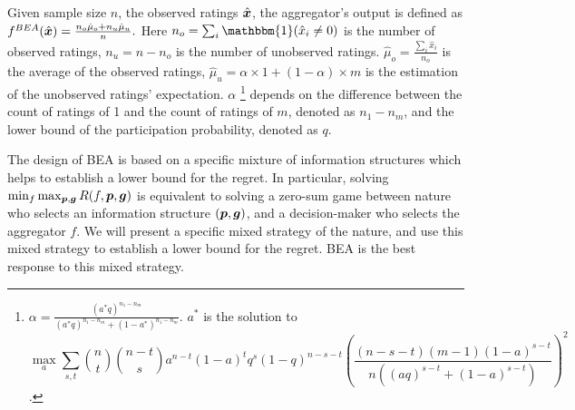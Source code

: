 \begin{definition}
Given sample size $n$, the observed ratings $\hat{{\bm{x}}}$, the aggregator's output is defined as
\(f^{BEA}(\hat{{\bm{x}}})=\frac{n_o\hat{\mu}_o+n_u \hat{\mu}_u}{n}.\) Here $n_o=\sum_i \mathbbm{1}(\hat{x}_i\neq 0)$ is the number of observed ratings, $n_u=n-n_o$ is the number of unobserved ratings. $\hat{\mu}_o=\frac{\sum_i \hat{x}_i}{n_o}$ is the average of the observed ratings, $\hat{\mu}_u=\alpha\times 1+(1-\alpha)\times m$ is the estimation of the unobserved ratings' expectation. \(\alpha\) \footnote{$\alpha=\frac{(a^*q)^{n_1-n_m}}{(a^*q)^{n_1-n_m}+(1-a^*)^{n_1-n_m}}$. $a^*$ is the solution to
 $$\max_a \sum_{s,t} \binom{n}{t}\binom{n-t}{s}a^{n-t}(1-a)^tq^s(1-q)^{n-s-t}\left(\frac{(n-s-t)(m-1)(1-a)^{s-t}}{n((aq)^{s-t}+(1-a)^{s-t})}\right)^2$$.} depends on the difference between the count of ratings of 1 and the count of ratings of \(m\), denoted as \(n_1-n_m\), and the lower bound of the participation probability, denoted as $q$.
\end{definition}

The design of BEA is based on a specific mixture of information structures which helps to establish a lower bound for the regret. In particular, solving $\min_f\max_{{\bm{p}},{\bm{g}}} R(f,{\bm{p}},{\bm{g}})$ is equivalent to solving a zero-sum game between nature who selects an information structure $({\bm{p}},{\bm{g}})$, and a decision-maker who selects the aggregator $f$. We will present a specific mixed strategy of the nature, and use this mixed strategy to establish a lower bound for the regret. BEA is the best response to this mixed strategy. 

